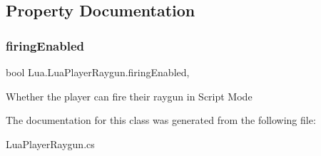 \subsection{Property Documentation}
\mbox{\label{class_lua_1_1_lua_player_raygun_a002f731fc9b1c217a12b03045e87a0cd}} 
\subsubsection{\texorpdfstring{firingEnabled}{firingEnabled}}
{\footnotesize\ttfamily bool Lua.\+Lua\+Player\+Raygun.\+firing\+Enabled\hspace{0.3cm}{\ttfamily [get]}, {\ttfamily [set]}}



Whether the player can fire their raygun in Script Mode 



The documentation for this class was generated from the following file\+:\begin{DoxyCompactItemize}
\item 
Lua\+Player\+Raygun.\+cs\end{DoxyCompactItemize}
